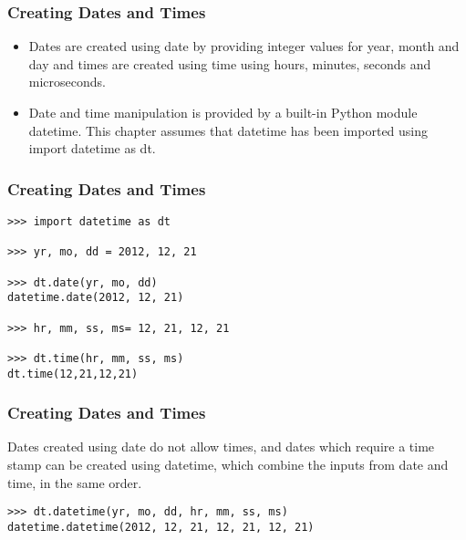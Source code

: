 \documentclass[KSmainSlides.tex]{subfiles}
\begin{document}
 

\begin{frame}[fragile]
\frametitle{Creating Dates and Times}
\begin{itemize}
\item Dates are created using date by providing integer values for year, month and day and times are created
using time using hours, minutes, seconds and microseconds.

\item Date and time manipulation is provided by a built-in Python module datetime. This chapter assumes that
datetime has been imported using import datetime as dt.
\end{itemize}

\end{frame}
\begin{frame}[fragile]
\frametitle{Creating Dates and Times}
\begin{framed}
\begin{verbatim}
>>> import datetime as dt

>>> yr, mo, dd = 2012, 12, 21

>>> dt.date(yr, mo, dd)
datetime.date(2012, 12, 21)

>>> hr, mm, ss, ms= 12, 21, 12, 21

>>> dt.time(hr, mm, ss, ms)
dt.time(12,21,12,21)

\end{verbatim}
\end{framed}
	\end{frame}
	\begin{frame}[fragile]
	\frametitle{Creating Dates and Times}
Dates created using date do not allow times, and dates which require a time stamp can be created using
datetime, which combine the inputs from date and time, in the same order.
\begin{framed}
\begin{verbatim}
>>> dt.datetime(yr, mo, dd, hr, mm, ss, ms)
datetime.datetime(2012, 12, 21, 12, 21, 12, 21)

\end{verbatim}
\end{framed}
	\end{frame}
\end{document}
